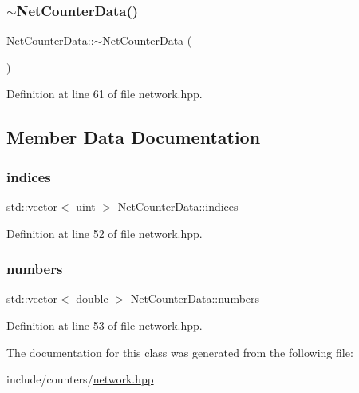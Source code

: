 \mbox{\label{class_net_counter_data_a2e88fcc7f0296d791fe9f0facd24489f}} 
\subsubsection{\texorpdfstring{$\sim$\+Net\+Counter\+Data()}{~NetCounterData()}}
{\footnotesize\ttfamily Net\+Counter\+Data\+::$\sim$\+Net\+Counter\+Data (\begin{DoxyParamCaption}{ }\end{DoxyParamCaption})\hspace{0.3cm}{\ttfamily [inline]}}



Definition at line 61 of file network.\+hpp.



\subsection{Member Data Documentation}
\mbox{\label{class_net_counter_data_ae2f47af99f3fa785d3faac089ab90d83}} 
\subsubsection{\texorpdfstring{indices}{indices}}
{\footnotesize\ttfamily std\+::vector$<$ \hyperlink{typedefs_8hpp_a91ad9478d81a7aaf2593e8d9c3d06a14}{uint} $>$ Net\+Counter\+Data\+::indices}



Definition at line 52 of file network.\+hpp.

\mbox{\label{class_net_counter_data_ad218e01cd14fb4abfbe21d8d92a6cbd3}} 
\subsubsection{\texorpdfstring{numbers}{numbers}}
{\footnotesize\ttfamily std\+::vector$<$ double $>$ Net\+Counter\+Data\+::numbers}



Definition at line 53 of file network.\+hpp.



The documentation for this class was generated from the following file\+:\begin{DoxyCompactItemize}
\item 
include/counters/\hyperlink{network_8hpp}{network.\+hpp}\end{DoxyCompactItemize}
